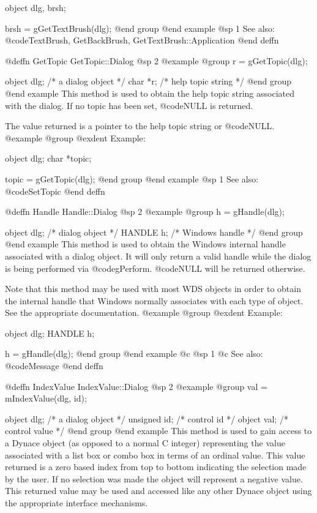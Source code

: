 object  dlg, brsh;

brsh = gGetTextBrush(dlg);
@end group
@end example
@sp 1
See also:  @code{TextBrush, GetBackBrush, GetTextBrush::Application}
@end deffn











@deffn {GetTopic} GetTopic::Dialog
@sp 2
@example
@group
r = gGetTopic(dlg);

object  dlg;   /*  a dialog object   */
char    *r;    /*  help topic string */
@end group
@end example
This method is used to obtain the help topic string associated with the
dialog.  If no topic has been set, @code{NULL} is returned.

The value returned is a pointer to the help topic string or @code{NULL}.
@example
@group
@exdent Example:

object  dlg;
char    *topic;

topic = gGetTopic(dlg);
@end group
@end example
@sp 1
See also:  @code{SetTopic}
@end deffn




@deffn {Handle} Handle::Dialog
@sp 2
@example
@group
h = gHandle(dlg);

object  dlg;    /*  dialog object   */
HANDLE  h;      /*  Windows handle  */
@end group
@end example
This method is used to obtain the Windows internal handle associated with
a dialog object.  It will only return a valid handle while the dialog
is being performed via @code{gPerform}.  @code{NULL} will be returned
otherwise.

Note that this method may be used with most WDS objects in order to obtain
the internal handle that Windows normally associates with each type of object.
See the appropriate documentation.
@example
@group
@exdent Example:

object  dlg;
HANDLE  h;

h = gHandle(dlg);
@end group
@end example
@c @sp 1
@c See also:  @code{Message}
@end deffn








@deffn {IndexValue} IndexValue::Dialog
@sp 2
@example
@group
val = mIndexValue(dlg, id);

object  dlg;    /*  a dialog object  */
unsigned id;    /*  control id       */
object  val;    /*  control value    */
@end group
@end example
This method is used to gain access to a Dynace object (as opposed to a
normal C integer) representing the value associated with a list box or
combo box in terms of an ordinal value. This value returned is a zero
based index from top to bottom indicating the selection made by the
user.  If no selection was made the object will represent a negative
value.  This returned value may be used and accessed like any other
Dynace object using the appropriate interface mechanisms.

